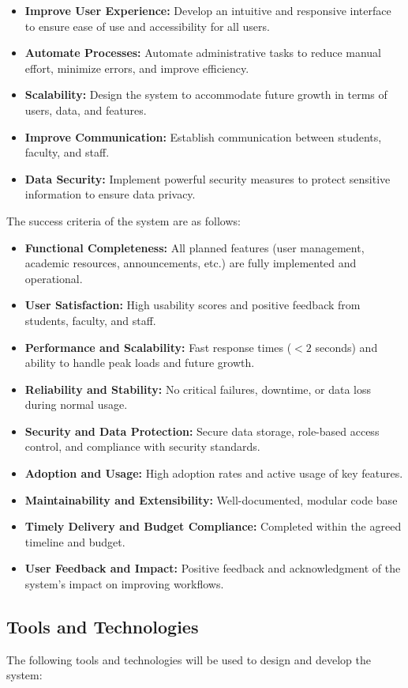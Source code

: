 \documentclass[11pt]{article}
\begin{document}
\begin{itemize}
    \item \textbf{Improve User Experience:} Develop an intuitive and responsive interface to ensure ease of use and accessibility for all users.
    \item \textbf{Automate Processes:} Automate administrative tasks to reduce manual effort, minimize errors, and improve efficiency.
    \item \textbf{Scalability:} Design the system to accommodate future growth in terms of users, data, and features.
    \item \textbf{Improve Communication:} Establish communication between students, faculty, and staff.
    \item \textbf{Data Security:} Implement powerful security measures to protect sensitive information to ensure data privacy.
\end{itemize}
The success criteria of the system are as follows:
\begin{itemize}
    \item \textbf{Functional Completeness:} All planned features (user management, academic resources, announcements, etc.) are fully implemented and operational.
    \item \textbf{User Satisfaction:} High usability scores and positive feedback from students, faculty, and staff.
    \item \textbf{Performance and Scalability:} Fast response times ($<2$ seconds) and ability to handle peak loads and future growth.
    \item \textbf{Reliability and Stability:} No critical failures, downtime, or data loss during normal usage.
    \item \textbf{Security and Data Protection:} Secure data storage, role-based access control, and compliance with security standards.
    \item \textbf{Adoption and Usage:} High adoption rates and active usage of key features.
    \item \textbf{Maintainability and Extensibility:} Well-documented, modular code base
    \item \textbf{Timely Delivery and Budget Compliance:} Completed within the agreed timeline and budget.
    \item \textbf{User Feedback and Impact:} Positive feedback and acknowledgment of the system's impact on improving workflows.
\end{itemize}

\subsection{Tools and Technologies}
The following tools and technologies will be used to design and develop the system:
\end{document}
